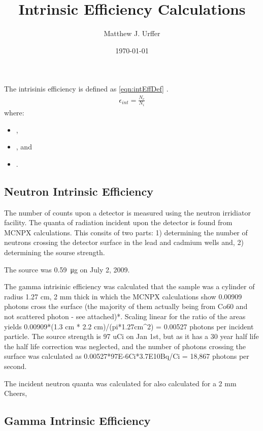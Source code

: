 \documentclass[draftcls,onecolumn]{IEEEtran}
\begin{document}
\title{Intrinsic Efficiency Calculations}
\author{Matthew J. Urffer}
\date{\today}
\maketitle

\printnomenclature
\printindex

\listoftodos
\tableofcontents
\listoffigures
\listoftables
\lstlistoflistings

The intrisinis efficiency is defined as \eqref{eqn:intEffDef} \cite{knoll_radiation_2009}.
\begin{align}
  \epsilon_{int} = \frac{N_c}{N_i}
\end{align}
where:
\begin{itemize}
  \item[] ,
  \item[] , and
  \item[] .
\end{itemize}


\subsection{Neutron Intrinsic Efficiency}
The number of counts upon a detector is measured using the neutron irridiator facility.
The quanta of radiation incident upon the detector is found from MCNPX calculations.
This consits of two parts: 1) determining the number of neutrons crossing the detector surface in the lead and cadmium wells and, 2) determining the sourse strength.

The  source was \SI{0.59}{\ug} on July 2, 2009.

The gamma intrisinic efficiency was calculated that the sample was a cylinder of radius 1.27 cm, 2 mm thick in which the MCNPX calculations show 0.00909 photons cross the surface (the majority of them actually being from Co60 and not scattered photon - see attached)*. Scaling linear for the ratio of the areas yields 0.00909*(1.3 cm * 2.2 cm)/(pi*1.27cm^2) = 0.00527 photons per incident particle.  The source strength is 97 uCi on Jan 1st, but as it has a 30 year half life the half life correction was neglected, and the number of photons crossing the surface was calculated as 0.00527*97E-6Ci*3.7E10Bq/Ci = 18,867 photons per second.

The incident neutron quanta was calculated for also calculated for a 2 mm
Cheers,


\subsection{Gamma Intrinsic Efficiency}


\end{document}
